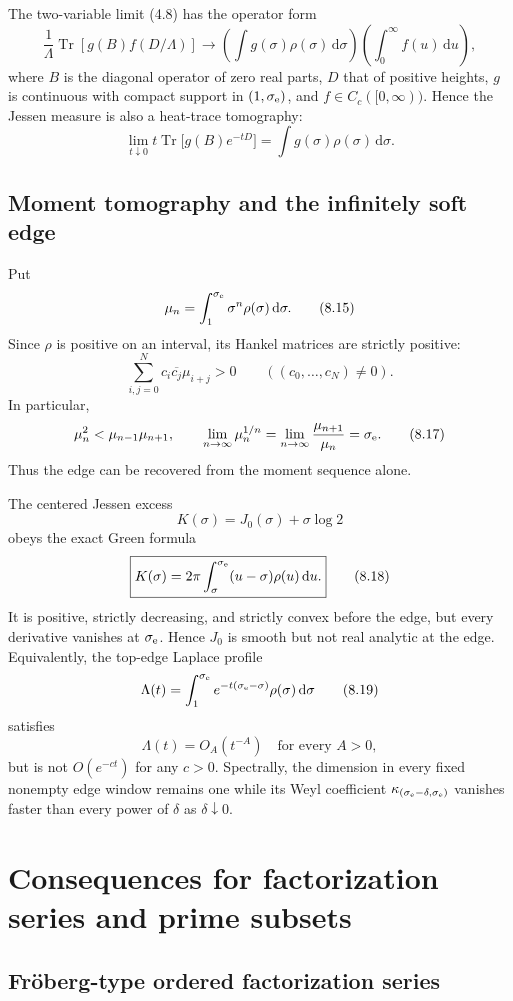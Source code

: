 \documentclass[11pt]{article}
\theoremstyle{definition}
\theoremstyle{remark}
\newcommand{\dd}{\,\mathrm d}
\DeclareMathOperator{\Tr}{Tr}
\begin{document}
The two-variable limit (4.8) has the operator form
\[
 \frac1\Lambda\Tr\!\left[g(B)f(D/\Lambda)\right]
 \longrightarrow
 \left(\int g(\sigma)\rho(\sigma)\dd\sigma\right)
 \left(\int_0^\infty f(u)\dd u\right),
\tag{8.13}
\]
where $B$ is the diagonal operator of zero real parts, $D$ that of positive heights,
$g$ is continuous with compact support in $(1,\sigma_{\rm e})$, and
$f\in C_c([0,\infty))$.  Hence the Jessen measure is also a heat-trace tomography:
\[
 \lim_{t\downarrow0}t\Tr\bigl[g(B)e^{-tD}\bigr]
 =\int g(\sigma)\rho(\sigma)\dd\sigma.
\tag{8.14}
\]

\subsection{Moment tomography and the infinitely soft edge}

Put
\[
 \mu_n=\int_1^{\sigma_{\rm e}}\sigma^n\rho(\sigma)\dd\sigma.
\tag{8.15}
\]
Since $\rho$ is positive on an interval, its Hankel matrices are strictly positive:
\[
 \sum_{i,j=0}^Nc_i\overline{c_j}\mu_{i+j}>0
 \qquad((c_0,\ldots,c_N)\ne0).
\tag{8.16}
\]
In particular,
\[
 \mu_n^2<\mu_{n-1}\mu_{n+1},
 \qquad
 \lim_{n\to\infty}\mu_n^{1/n}
 =\lim_{n\to\infty}\frac{\mu_{n+1}}{\mu_n}
 =\sigma_{\rm e}.
\tag{8.17}
\]
Thus the edge can be recovered from the moment sequence alone.

The centered Jessen excess
\[
 K(\sigma)=J_0(\sigma)+\sigma\log2
\]
obeys the exact Green formula
\[
 \boxed{
 K(\sigma)=2\pi\int_\sigma^{\sigma_{\rm e}}
 (u-\sigma)\rho(u)\dd u.
 }
\tag{8.18}
\]
It is positive, strictly decreasing, and strictly convex before the edge, but every
derivative vanishes at $\sigma_{\rm e}$.  Hence $J_0$ is smooth but not real analytic
at the edge.  Equivalently, the top-edge Laplace profile
\[
 \Lambda(t)=\int_1^{\sigma_{\rm e}}
 e^{-t(\sigma_{\rm e}-\sigma)}\rho(\sigma)\dd\sigma
\tag{8.19}
\]
satisfies
\[
 \Lambda(t)=O_A(t^{-A})\quad\text{for every }A>0,
\tag{8.20}
\]
but is not $O(e^{-ct})$ for any $c>0$.  Spectrally, the dimension in every fixed
nonempty edge window remains one while its Weyl coefficient
$\kappa_{(\sigma_{\rm e}-\delta,\sigma_{\rm e})}$ vanishes faster than every power of
$\delta$ as $\delta\downarrow0$.

\section{Consequences for factorization series and prime subsets}
\label{sec:applications}

\subsection{Fr\"oberg-type ordered factorization series}
\end{document}
